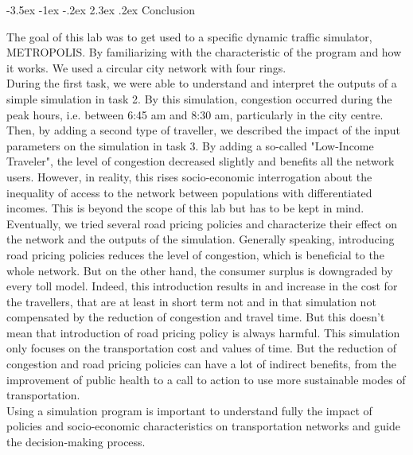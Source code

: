 \documentclass[a4paper, 12pt,oneside]{article}
\makeatletter
\renewcommand{\section}{\@startsection {section}{1}{\z@}%
             {-3.5ex \@plus -1ex \@minus -.2ex}%
             {2.3ex \@plus.2ex}%
             {\normalfont\normalsize\bfseries}}
\makeatother
\begin{document}
\section{Conclusion}

The goal of this lab was to get used to a specific dynamic traffic simulator, METROPOLIS. By familiarizing with the characteristic of the program and how it works. We used a circular city network with four rings.\\

During the first task, we were able to understand and interpret the outputs of a simple simulation in task 2. By this simulation, congestion occurred during the peak hours, i.e. between 6:45 am and 8:30 am, particularly in the city centre.\\

Then, by adding a second type of traveller, we described the impact of the input parameters on the simulation in task 3. By adding a so-called "Low-Income Traveler", the level of congestion decreased slightly and benefits all the network users. However, in reality, this rises socio-economic interrogation about the inequality of access to the network between populations with differentiated incomes. This is beyond the scope of this lab but has to be kept in mind.\\

Eventually, we tried several road pricing policies and characterize their effect on the network and the outputs of the simulation. Generally speaking, introducing road pricing policies reduces the level of congestion, which is beneficial to the whole network. But on the other hand, the consumer surplus is downgraded by every toll model. Indeed, this introduction results in and increase in the cost for the travellers, that are at least in short term not and in that simulation not compensated by the reduction of congestion and travel time. But this doesn't mean that introduction of road pricing policy is always harmful. This simulation only focuses on the transportation cost and values of time. But the reduction of congestion and road pricing policies can have a lot of indirect benefits, from the improvement of public health to a call to action to use more sustainable modes of transportation. \\

Using a simulation program is important to understand fully the impact of policies and socio-economic characteristics on transportation networks and guide the decision-making process.
\end{document}
